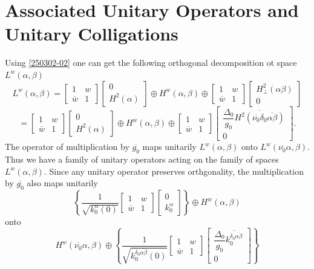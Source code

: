 \documentclass[reqno,11pt,centertags]{article}
\theoremstyle{definition}
\def\a{\alpha}
\def\b{\beta}
\def\d{\delta}
\def\D{\Delta}
\begin{document}
\section{Associated Unitary Operators and Unitary Colligations}
Using \eqref{250302-02} one can get the following orthogonal decomposition
ot space $L^w(\a,\b)$
$$
L^w(\a,\b)=
\begin{bmatrix}
1 & w \\
\overline{w} & 1
\end{bmatrix}
\begin{bmatrix}
0
\\
H^2(\a)
\end{bmatrix}
\oplus
H^w(\a, \b)
\oplus
\begin{bmatrix}
1 & w \\
\overline{w} & 1
\end{bmatrix}
\begin{bmatrix}
H^2_{\perp}(\a\b)
\\
0
\end{bmatrix}
$$
$$
=
\begin{bmatrix}
1 & w \\
\overline{w} & 1
\end{bmatrix}
\begin{bmatrix}
0
\\
H^2(\a)
\end{bmatrix}
\oplus
H^w(\a, \b)
\oplus
\begin{bmatrix}
1 & w \\
\overline{w} & 1
\end{bmatrix}
\begin{bmatrix}
\dfrac{\D_0}{g_0}\overline{H^2(\overline{\nu_0}\d_0\overline{\alpha\b})}
\\
0
\end{bmatrix}.
$$
The operator of multiplication by $\overline{g_0}$ maps unitarily $L^w(\a,\b)$
onto $L^w(\overline{\nu_0}\a,\b)$.
Thus we have a family of unitary operators acting on the family of spaces $L^w(\a,\b)$.
Since any unitary operator preserves orthgonality, the
multiplication by $\overline{g_0}$  also maps unitarily
$$
\left\{
\dfrac{1}{\sqrt{k^\a_0(0)}}
\begin{bmatrix}
1 & w \\
\overline{w} & 1
\end{bmatrix}
\begin{bmatrix}
0
\\
k^\a_0
\end{bmatrix}
\right\}
\oplus
H^w(\a, \b)
$$
onto
$$
H^w(\overline{\nu_0}\a, \b)
\oplus
\left\{
\dfrac{1}{\sqrt{k^{\d_0\overline{\alpha\b}}_0(0)}}
\begin{bmatrix}
1 & w \\
\overline{w} & 1
\end{bmatrix}
\begin{bmatrix}
\dfrac{\D_0}{g_0}\overline{k^{\d_0\overline{\alpha\b}}_0}
\\
0
\end{bmatrix}
\right\}
$$
\end{document}
